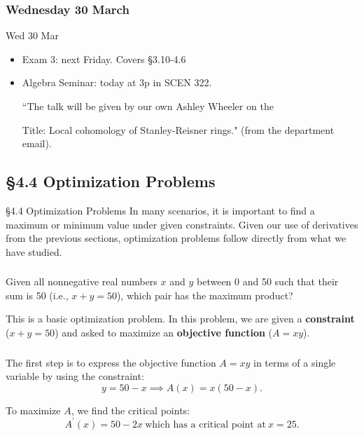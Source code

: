 \documentclass[cal1spr16Lectures.tex]{subfiles}
\begin{document}

\subsubsection{\bf Wednesday 30 March}

\begin{frame}[allowframebreaks]{Wed 30 Mar}
\begin{itemize}%
\item Exam 3: next Friday.  Covers \S 3.10-4.6
\item Algebra Seminar: today at 3p in SCEN 322.

``The talk will be given by our own Ashley Wheeler on the 

Title:  Local cohomology of Stanley-Reisner rings." (from the department email). 
\end{itemize}
\end{frame}

\subsection[4.4 Optimization Problems]{\S 4.4 Optimization Problems}

\begin{frame}{\S 4.4 Optimization Problems}
\small
In many scenarios, it is important to find a maximum or minimum value under given constraints.  Given our use of derivatives from the previous sections, optimization problems follow directly from what we have studied.
\end{frame}

\begin{frame}
\frametitle{}
\small
\begin{que} Given all nonnegative real numbers $x$ and $y$ between 0 and 50 such that their sum is 50 (i.e., $x+y=50$), which pair has the maximum product? \end{que}

\vspace{2pc}
This is a basic optimization problem.  In this problem, we are given a \alert{\bf constraint} ($x+y=50$) and asked to maximize an \alert{\bf objective function} ($A=xy$).
\end{frame}

\begin{frame}
\frametitle{}
\small
The first step is to express the objective function $A=xy$ in terms of a \alert{single variable} by using the constraint:
\[y=50-x \implies A(x)=x(50-x).\]

\vspace{2pc}
To maximize $A$, we find the critical points:
\[A^{\prime}(x)=50-2x\ \text{which has a critical point at}\ x=25.\]
\end{frame}
\end{document}
